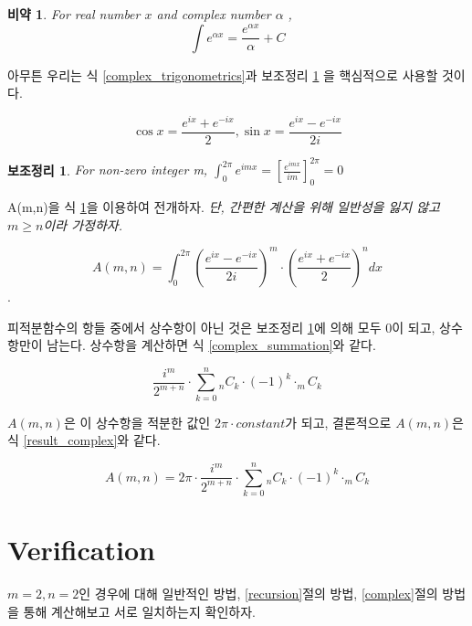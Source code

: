 \documentclass[11pt]{article}
\newtheorem{lemma}{보조정리}
\newtheorem{gap}{비약}
\begin{document}
\begin{gap} \label{complex_integration}
For real number $x$ and complex number $\alpha$ , 
$$\int{e^{\alpha x}} = \frac{e^{\alpha x}}{\alpha} + C $$
\end{gap}

아무튼 우리는 식 \ref{complex_trigonometrics}과 보조정리 \ref{complex_integration_idea} 을 핵심적으로 사용할 것이다.

\begin{equation} \label{complex_trigonometrics}
\cos x = \frac{e^{ix}+e^{-ix}}{2} , \sin x = \frac{e^{ix}-e^{-ix}}{2i}
\end{equation}

\begin{lemma} \label{complex_integration_idea}
For non-zero integer m, $\int_{0}^{2\pi}{e^{imx}} = [\frac{e^{imx}}{im}]_{0}^{2\pi} = 0$
\end{lemma}

A(m,n)을 식 \ref{complex_integration}을 이용하여 전개하자. \emph{단, 간편한 계산을 위해 일반성을 잃지 않고 $m\geq n$이라 가정하자.}

$$A(m,n)=\int_{0}^{2\pi}{ (\frac{e^{ix}-e^{-ix}}{2i})^m \cdot (\frac{e^{ix}+e^{-ix}}{2})^n dx }$$.

피적분함수의 항들 중에서 상수항이 아닌 것은 보조정리 \ref{complex_integration_idea}에 의해 모두 0이 되고, 상수항만이 남는다. 상수항을 계산하면 식 \ref{complex_summation}와 같다.

\begin{equation} \label{complex_summation}
\frac{i^m}{2^{m+n}} \cdot \sum_{k=0}^{n}{_{n}C_k \cdot (-1)^k \cdot _{m}C_k}
\end{equation}

$A(m,n)$은 이 상수항을 적분한 값인 $2\pi \cdot constant$가 되고, 결론적으로 $A(m,n)$은 식 \ref{result_complex}와 같다.

\begin{equation} \label{result_complex}
A(m,n)=2\pi \cdot \frac{i^m}{2^{m+n}} \cdot \sum_{k=0}^{n}{_{n}C_k \cdot (-1)^k \cdot _{m}C_k}
\end{equation}

\section{Verification}
$m=2, n=2$인 경우에 대해 일반적인 방법, \ref{recursion}절의 방법, \ref{complex}절의 방법을 통해 계산해보고 서로 일치하는지 확인하자.
\end{document}
